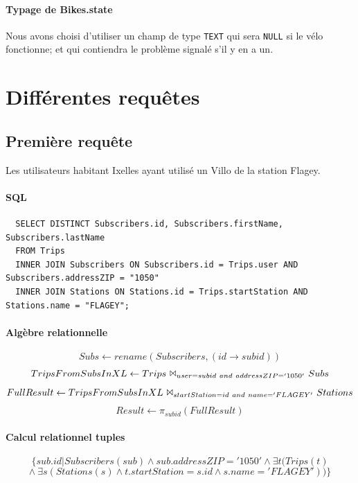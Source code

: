 \documentclass[a4paper]{article}
\begin{document}
  \paragraph{Typage de Bikes.state} Nous avons choisi d'utiliser un champ de type \texttt{TEXT} qui sera \texttt{NULL} si le vélo fonctionne; et qui contiendra le problème signalé s'il y en a un.

\section{Différentes requêtes}



\subsection{Première requête}
	Les utilisateurs habitant Ixelles ayant utilisé un Villo de la station Flagey.

	\paragraph{SQL}
  \begin{verbatim}
  SELECT DISTINCT Subscribers.id, Subscribers.firstName, Subscribers.lastName
  FROM Trips
  INNER JOIN Subscribers ON Subscribers.id = Trips.user AND Subscribers.addressZIP = "1050"
  INNER JOIN Stations ON Stations.id = Trips.startStation AND Stations.name = "FLAGEY";
  \end{verbatim}
  
	\paragraph{Algèbre relationnelle}
    $$ Subs \leftarrow rename(Subscribers, (id \rightarrow subid))$$
    $$TripsFromSubsInXL \leftarrow Trips\ \Bowtie_{user=subid\ and\ addressZIP='1050'}\ Subs$$
   	$$FullResult \leftarrow TripsFromSubsInXL\ \Bowtie_{startStation=id\ and\  name='FLAGEY'}\ Stations$$
    $$Result \leftarrow \pi_{subid}(FullResult)$$
    
    \paragraph{Calcul relationnel tuples}
    $$ \{sub.id | Subscribers(sub) \land sub.addressZIP='1050' \land \exists t (Trips(t)$$
    $$ \land\ \exists s (Stations(s) \land t.startStation=s.id \land s.name = 'FLAGEY'))  \} $$
\end{document}
